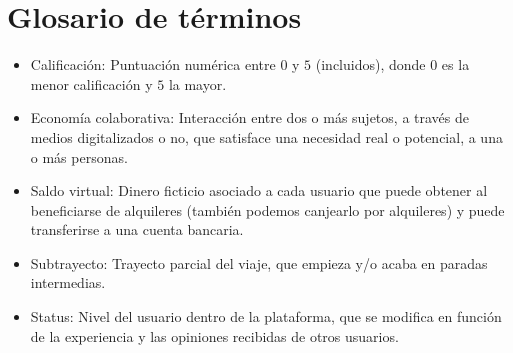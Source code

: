 \documentclass[11pt,spanish]{article} %
\begin{document}
\section{Glosario de términos}
\begin{itemize}
	\item Calificación: Puntuación numérica entre $0$ y $5$ (incluidos), donde $0$ es la menor calificación y $5$ la mayor.
	\item Economía colaborativa: Interacción entre dos o más sujetos, a través de medios digitalizados o no, que satisface una necesidad real o potencial, a una o más personas.	
	\item Saldo virtual: Dinero ficticio asociado a cada usuario que puede obtener al beneficiarse de alquileres (también podemos canjearlo por alquileres) y puede transferirse a una cuenta bancaria.
	\item Subtrayecto: Trayecto parcial del viaje, que empieza y/o acaba en paradas intermedias.
	\item Status: Nivel del usuario dentro de la plataforma, que se modifica en función de la experiencia y las opiniones recibidas de otros usuarios.
\end{itemize}










\end{document}
